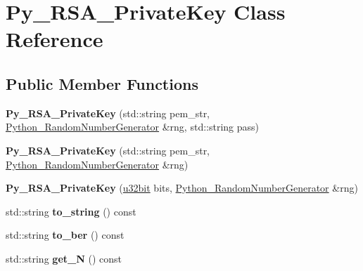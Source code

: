 \hypertarget{classPy__RSA__PrivateKey}{\section{Py\-\_\-\-R\-S\-A\-\_\-\-Private\-Key Class Reference}
\label{classPy__RSA__PrivateKey}
}
\subsection*{Public Member Functions}
\begin{DoxyCompactItemize}
\item 
\hypertarget{classPy__RSA__PrivateKey_a489e94db84bee1ffd26a4f3ed253013a}{{\bfseries Py\-\_\-\-R\-S\-A\-\_\-\-Private\-Key} (std\-::string pem\-\_\-str, \hyperlink{classPython__RandomNumberGenerator}{Python\-\_\-\-Random\-Number\-Generator} \&rng, std\-::string pass)}\label{classPy__RSA__PrivateKey_a489e94db84bee1ffd26a4f3ed253013a}

\item 
\hypertarget{classPy__RSA__PrivateKey_a881e457323587319a704aab531207d96}{{\bfseries Py\-\_\-\-R\-S\-A\-\_\-\-Private\-Key} (std\-::string pem\-\_\-str, \hyperlink{classPython__RandomNumberGenerator}{Python\-\_\-\-Random\-Number\-Generator} \&rng)}\label{classPy__RSA__PrivateKey_a881e457323587319a704aab531207d96}

\item 
\hypertarget{classPy__RSA__PrivateKey_a84704280d2efd18f132401d5aa298d5e}{{\bfseries Py\-\_\-\-R\-S\-A\-\_\-\-Private\-Key} (\hyperlink{namespaceBotan_aacc7d03c95e97e76168fc1c819031830}{u32bit} bits, \hyperlink{classPython__RandomNumberGenerator}{Python\-\_\-\-Random\-Number\-Generator} \&rng)}\label{classPy__RSA__PrivateKey_a84704280d2efd18f132401d5aa298d5e}

\item 
\hypertarget{classPy__RSA__PrivateKey_a6c81c09fe3b04b753c9049d74b086e9f}{std\-::string {\bfseries to\-\_\-string} () const }\label{classPy__RSA__PrivateKey_a6c81c09fe3b04b753c9049d74b086e9f}

\item 
\hypertarget{classPy__RSA__PrivateKey_a87cfe844e5a73dcf67a7b2f982aed176}{std\-::string {\bfseries to\-\_\-ber} () const }\label{classPy__RSA__PrivateKey_a87cfe844e5a73dcf67a7b2f982aed176}

\item 
\hypertarget{classPy__RSA__PrivateKey_a92b548412807c252ef95739c79b8c5d1}{std\-::string {\bfseries get\-\_\-\-N} () const }\label{classPy__RSA__PrivateKey_a92b548412807c252ef95739c79b8c5d1}


\end{DoxyCompactItemize}

